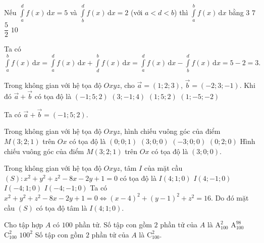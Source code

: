 \begin{ex}%
	Nếu $\displaystyle\int\limits_a^d f(x)\mathrm{\,d}x =5$ và $\displaystyle\int\limits_b^d f(x)\mathrm{\,d}x =2$ (với $a<d<b$) thì $\displaystyle\int\limits_a^b f(x)\mathrm{\,d}x$ bằng
		\choice
	{\True $3$}
	{$7$}
	{$\dfrac{5}{2}$}
	{$10$}
	\loigiai
	{ Ta có $\displaystyle\int\limits_a^b f(x)\mathrm{\,d}x = \displaystyle\int\limits_a^d f(x)\mathrm{\,d}x + \displaystyle\int\limits_d^b f(x)\mathrm{\,d}x = \displaystyle\int\limits_a^d f(x)\mathrm{\,d}x - \displaystyle\int\limits_b^d f(x)\mathrm{\,d}x = 5-2=3.$
		
	}
\end{ex}

\begin{ex}%
	Trong không gian với hệ tọa độ $Oxyz$, cho $\vec{a}=(1;2;3)$, $\vec{b}=(-2;3;-1)$. Khi đó $\vec{a}+\vec{b}$ có tọa độ là
		\choice
	{\True $(-1;5;2)$}
	{$(3;-1;4)$}
	{$(1;5;2)$}
	{$(1;-5;-2)$}
	\loigiai
	{Ta có $\vec{a}+\vec{b} =(-1;5;2)$.
		
	}
\end{ex}

\begin{ex}%
	Trong không gian với hệ tọa độ $Oxyz$, hình chiếu vuông góc của điểm $M(3;2;1)$ trên $Ox$ có tọa độ là
		\choice
	{$(0;0;1)$}
	{\True $(3;0;0)$}
	{$(-3;0;0)$}
	{$(0;2;0)$}
	\loigiai
	{Hình chiếu vuông góc của điểm $M(3;2;1)$ trên $Ox$ có tọa độ là $(3;0;0)$.
	}
\end{ex}

\begin{ex}%
	Trong không gian với hệ tọa độ $Oxyz$, tâm $I$ của mặt cầu $(S) \colon x^2+y^2+z^2-8x-2y+1=0$ có tọa độ là 
		\choice
	{\True $I(4;1;0)$}
	{$I(4;-1;0)$}
	{$I(-4;1;0)$}
	{$I(-4;-1;0)$}
	\loigiai
	{ Ta có $x^2+y^2+z^2-8x-2y+1=0 \Leftrightarrow (x-4)^2+(y-1)^2+z^2=16$. Do đó mặt cầu $(S)$ có tọa độ tâm là $I(4;1;0)$.	
	}
\end{ex}
 
\begin{ex}%
	Cho tập hợp $A$ có $100$ phần tử. Số tập con gồm $2$ phần tử của $A$ là
		\choice
	{$\mathrm{A}_{100}^2$}
	{$\mathrm{A}_{100}^{98}$}
	{\True $\mathrm{C}_{100}^2$}
	{$100^2$}
	\loigiai
	{Số tập con gồm $2$ phần tử của $A$ là $\mathrm{C}_{100}^2$.
	}
\end{ex}

